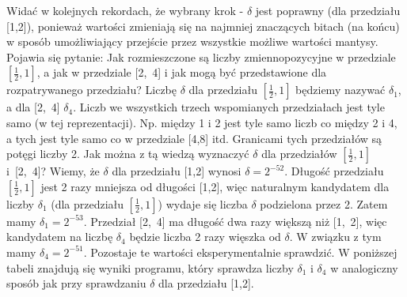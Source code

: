 \documentclass[]{article}
\begin{document}
	\newpage 
	Widać w kolejnych rekordach, że wybrany krok - $\delta$ jest poprawny (dla przedziału [1,2]), ponieważ wartości zmieniają się na najmniej znaczących bitach (na końcu) w sposób umożliwiający przejście przez wszystkie możliwe wartości mantysy. \newline 
	Pojawia się pytanie: Jak rozmieszczone są liczby zmiennopozycyjne w przedziale \([\frac{1}{2},1]\), a jak w przedziale \mbox{[2, 4]} i jak
	mogą być przedstawione dla rozpatrywanego przedziału? \newline
	Liczbę $\delta$ dla przedziału \([\frac{1}{2},1]\) będziemy nazywać $\delta_1$, a dla \mbox{[2, 4]}  $\delta_4$. Liczb we wszystkich trzech wspomianych przedziałach jest tyle samo (w tej reprezentacji). Np. między 1 i 2 jest tyle samo liczb co między 2 i 4, a tych jest tyle samo co w przedziale [4,8] itd. Granicami tych przedziałów są potęgi liczby 2. Jak można z tą wiedzą wyznaczyć $\delta$ dla przedziałów  \([\frac{1}{2},1]\) \mbox{i [2, 4]?} Wiemy, że $\delta$ dla przedziału [1,2] wynosi \(\delta = 2^{-52}\). Długość przedziału \([\frac{1}{2},1]\) jest 2 razy mniejsza od długości [1,2], więc naturalnym kandydatem dla liczby $\delta_1$ (dla przedziału \([\frac{1}{2},1]\)) wydaje się liczba $\delta$ podzielona przez 2. Zatem mamy \(\delta_1 = 2^{-53}\). \newline 
	Przedział \mbox{[2, 4]} ma długość dwa razy większą niż \mbox{[1, 2]}, więc kandydatem na liczbę $\delta_4$ będzie liczba 2 razy więszka od $\delta$. W związku z tym mamy \(\delta_4 = 2^{-51}\).
	Pozostaje te wartości eksperymentalnie sprawdzić. W poniższej tabeli znajdują się wyniki programu, który sprawdza liczby $\delta_1$ i $\delta_4$ w analogiczny sposób jak przy sprawdzaniu $\delta$ dla przedziału \mbox{[1,2]}.
	
\end{document}
